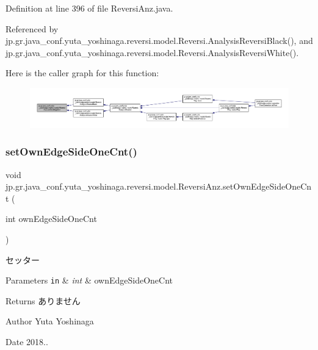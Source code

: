 Definition at line 396 of file Reversi\+Anz.\+java.



Referenced by jp.\+gr.\+java\+\_\+conf.\+yuta\+\_\+yoshinaga.\+reversi.\+model.\+Reversi.\+Analysis\+Reversi\+Black(), and jp.\+gr.\+java\+\_\+conf.\+yuta\+\_\+yoshinaga.\+reversi.\+model.\+Reversi.\+Analysis\+Reversi\+White().

Here is the caller graph for this function\+:
\nopagebreak
\begin{figure}[H]
\begin{center}
\leavevmode
\includegraphics[width=350pt]{classjp_1_1gr_1_1java__conf_1_1yuta__yoshinaga_1_1reversi_1_1model_1_1_reversi_anz_a6003ce46230d00dee3f83489000f1942_icgraph}
\end{center}
\end{figure}
\mbox{\label{classjp_1_1gr_1_1java__conf_1_1yuta__yoshinaga_1_1reversi_1_1model_1_1_reversi_anz_a637da35cb4ecce8e7b33c1d96b483a0e}} 
\subsubsection{\texorpdfstring{set\+Own\+Edge\+Side\+One\+Cnt()}{setOwnEdgeSideOneCnt()}}
{\footnotesize\ttfamily void jp.\+gr.\+java\+\_\+conf.\+yuta\+\_\+yoshinaga.\+reversi.\+model.\+Reversi\+Anz.\+set\+Own\+Edge\+Side\+One\+Cnt (\begin{DoxyParamCaption}\item[{int}]{own\+Edge\+Side\+One\+Cnt }\end{DoxyParamCaption})}



セッター 


\begin{DoxyParams}[1]{Parameters}
\mbox{\tt in}  & {\em int} & own\+Edge\+Side\+One\+Cnt \\
\hline
\end{DoxyParams}
\begin{DoxyReturn}{Returns}
ありません 
\end{DoxyReturn}
\begin{DoxyAuthor}{Author}
Yuta Yoshinaga 
\end{DoxyAuthor}
\begin{DoxyDate}{Date}
2018.. 
\end{DoxyDate}


